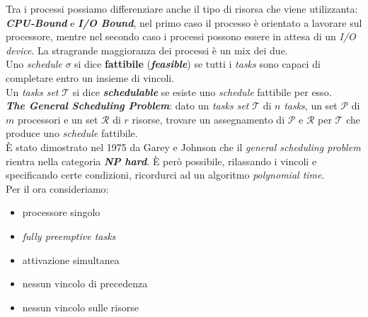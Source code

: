 Tra i processi possiamo differenziare anche il tipo di risorsa che viene utilizzanta: \textbf{\textit{CPU-Bound}} e \textbf{\textit{I/O Bound}}, nel primo caso il processo è orientato a lavorare sul processore, mentre nel secondo caso i processi possono essere in attesa di un \textit{I/O device}. La stragrande maggioranza dei processi è un mix dei due. \\ \newline
Uno \textit{schedule} $\sigma$ si dice \textbf{fattibile} (\textbf{\textit{feasible}}) se tutti i \textit{tasks} sono capaci di completare entro un insieme di vincoli. \\
Un \textit{tasks set} $\mathcal{T}$ si dice \textbf{\textit{schedulable}} se esiste uno \textit{schedule} fattibile per esso. \\ \newline
\textbf{\textit{The General Scheduling Problem}}: dato un \textit{tasks set} $\mathcal{T}$ di $n$ \textit{tasks}, un set $\mathcal{P}$ di $m$ processori e un set $\mathcal{R}$ di $r$ risorse, trovare un assegnamento di $\mathcal{P}$ e $\mathcal{R}$ per $\mathcal{T}$ che produce uno \textit{schedule} fattibile. \\
È stato dimostrato nel 1975 da Garey e Johnson che il \textit{general scheduling problem} rientra nella categoria \textbf{\textit{NP hard}}. È però possibile, rilassando i vincoli e specificando certe condizioni, ricordurci ad un algoritmo \textit{polynomial time}. \\
Per il ora consideriamo:
\begin{itemize}
    \item processore singolo
    \item \textit{fully preemptive tasks}
    \item attivazione simultanea
    \item nessun vincolo di precedenza
    \item nessun vincolo sulle risorse
\end{itemize}

